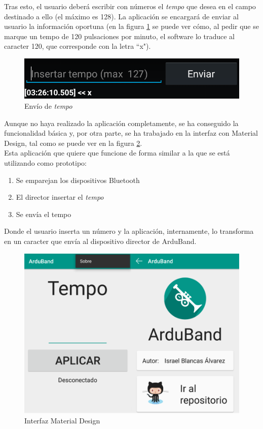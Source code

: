 Tras esto, el usuario deberá escribir con números el \textit{tempo} que desea en el campo
destinado a ello (el máximo es 128). La aplicación se encargará de enviar al usuario
la información oportuna (en la figura \ref{fig:protoand3} se puede ver cómo, al
pedir que se marque un tempo de 120 pulsaciones por minuto, el software lo traduce al caracter
120, que corresponde con la letra ``x").\\

\begin{figure}[!htb]
\centering
\includegraphics[width=1\textwidth]{./imagenes/arduband-android-prototipo3}
\caption{Envío de \textit{tempo}} \label{fig:protoand3}
\end{figure}

Aunque no haya realizado la aplicación completamente, se ha conseguido la funcionalidad básica y,
por otra parte, se ha trabajado en la interfaz con Material Design, tal como se puede ver en la
figura \ref{fig:material}.\\

Esta aplicación que quiere que funcione de forma similar a la que se está utilizando como
prototipo:
\begin{enumerate}
  \item Se emparejan los dispositivos Bluetooth
  \item El director insertar el \textit{tempo}
  \item Se envía el tempo
\end{enumerate}

Donde el usuario inserta un número y la aplicación, internamente, lo transforma en un
caracter que envía al dispositivo director de ArduBand.\\

\begin{figure}[!htb]
\centering
\includegraphics[width=1\textwidth]{./imagenes/material}
\caption{Interfaz Material Design} \label{fig:material}
\end{figure}

